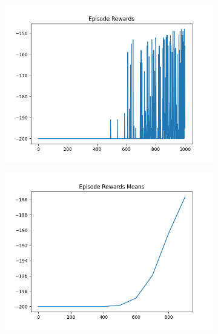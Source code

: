 \begin{figure}[H]
\begin{subfigure}{.47\linewidth}
        \includegraphics[width=\textwidth]{mountain/2024-06-15_11-57-24_dqn_mountaincar_episode_rewards.png}
    \end{subfigure}
    \begin{subfigure}{.47\linewidth}
        \centering
        \includegraphics[width=\textwidth]{mountain/2024-06-15_12-43-26_dqn_mountaincar_episode_rewards_means.png}
    \end{subfigure}
\end{figure}
